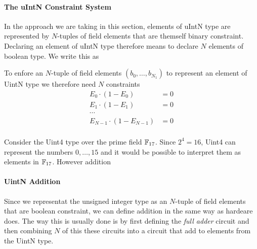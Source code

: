 \paragraph{The uIntN Constraint System} In the approach we are taking in this section, elements of uIntN type are represented by $N$-tuples of field elements that are themself binary constraint. Declaring an element of uIntN type therefore means to declare $N$ elements of boolean type. We write this as 
\begin{center}
\end{center}
To enfore an $N$-tuple of field elements $(b_0,\ldots,b_{N_1})$ to represent an element of UintN type we therefore need $N$ constraints 
\begin{align*}
E_0 \cdot (1-E_0) & = 0\\
E_1 \cdot (1-E_1) & = 0\\
\cdots &\\
E_{N-1} \cdot (1-E_{N-1}) & = 0\\
\end{align*}
\begin{example}
Consider the Uint4 type over the prime field $\mathbb{F}_{17}$. Since $2^4=16$, Uint4 can represent the numbers $0,\ldots, 15$ and it would be possible to interpret them as elements in $\mathbb{F}_{17}$. However addition 
\end{example} 
\paragraph{UintN Addition} Since we representat the unsigned integer type as an $N$-tuple of field elements that are boolean constraint, we can define addition in the same way as hardeare does. The way this is usually done is by first defining the \textit{full adder} circuit and then combining $N$ of this these circuits into a circuit that add to elements from the UintN type.

